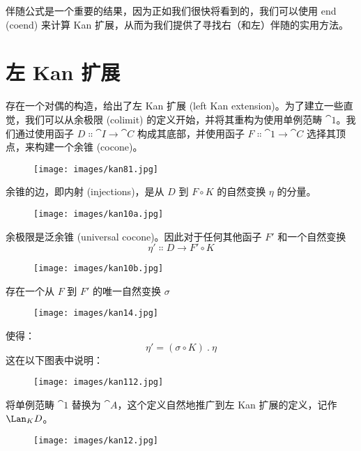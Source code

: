 伴随公式是一个重要的结果，因为正如我们很快将看到的，我们可以使用 end (coend) 来计算 Kan 扩展，从而为我们提供了寻找右（和左）伴随的实用方法。

\section{左 Kan 扩展}

存在一个对偶的构造，给出了左 Kan 扩展 (left Kan extension)。为了建立一些直觉，我们可以从余极限 (colimit) 的定义开始，并将其重构为使用单例范畴 $\cat{1}$。我们通过使用函子 $D \Colon \cat{I} \to \cat{C}$ 构成其底部，并使用函子 $F \Colon \cat{1} \to \cat{C}$ 选择其顶点，来构建一个余锥 (cocone)。

\begin{figure}[H]
  \centering
  \texttt{[image: images/kan81.jpg]}
\end{figure}

\noindent
余锥的边，即内射 (injections)，是从 $D$ 到 $F \circ K$ 的自然变换 $\eta$ 的分量。

\begin{figure}[H]
  \centering
  \texttt{[image: images/kan10a.jpg]}
\end{figure}

\noindent
余极限是泛余锥 (universal cocone)。因此对于任何其他函子 $F'$ 和一个自然变换
\[\eta' \Colon D \to F' \circ K\]

\begin{figure}[H]
  \centering
  \texttt{[image: images/kan10b.jpg]}
\end{figure}

\noindent
存在一个从 $F$ 到 $F'$ 的唯一自然变换 $\sigma$

\begin{figure}[H]
  \centering
  \texttt{[image: images/kan14.jpg]}
\end{figure}

\noindent
使得：
\[\eta' = (\sigma \circ K)\ .\ \eta\]
这在以下图表中说明：

\begin{figure}[H]
  \centering
  \texttt{[image: images/kan112.jpg]}
\end{figure}

\noindent
将单例范畴 $\cat{1}$ 替换为 $\cat{A}$，这个定义自然地推广到左 Kan 扩展的定义，记作 $\Lan_{K}D$。

\begin{figure}[H]
  \centering
  \texttt{[image: images/kan12.jpg]}
\end{figure}

